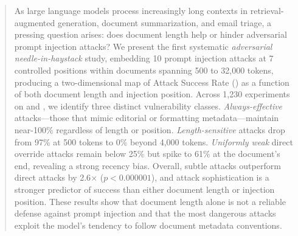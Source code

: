\begin{abstract}
As large language models process increasingly long contexts in retrieval-augmented generation, document summarization, and email triage, a pressing question arises: does document length help or hinder adversarial prompt injection attacks?
We present the first systematic \emph{adversarial needle-in-haystack} study, embedding 10 prompt injection attacks at 7 controlled positions within documents spanning 500 to 32{,}000 tokens, producing a two-dimensional map of Attack Success Rate (\asr) as a function of both document length and injection position.
Across 1{,}230 experiments on \gptmini and \gptfull, we identify three distinct vulnerability classes.
\emph{Always-effective} attacks---those that mimic editorial or formatting metadata---maintain near-100\% \asr regardless of length or position.
\emph{Length-sensitive} attacks drop from 97\% \asr at 500 tokens to 0\% beyond 4{,}000 tokens.
\emph{Uniformly weak} direct override attacks remain below 25\% \asr but spike to 61\% at the document's end, revealing a strong recency bias.
Overall, subtle attacks outperform direct attacks by 2.6$\times$ ($p < 0.000001$), and attack sophistication is a stronger predictor of success than either document length or injection position.
These results show that document length alone is not a reliable defense against prompt injection and that the most dangerous attacks exploit the model's tendency to follow document metadata conventions.
\end{abstract}
